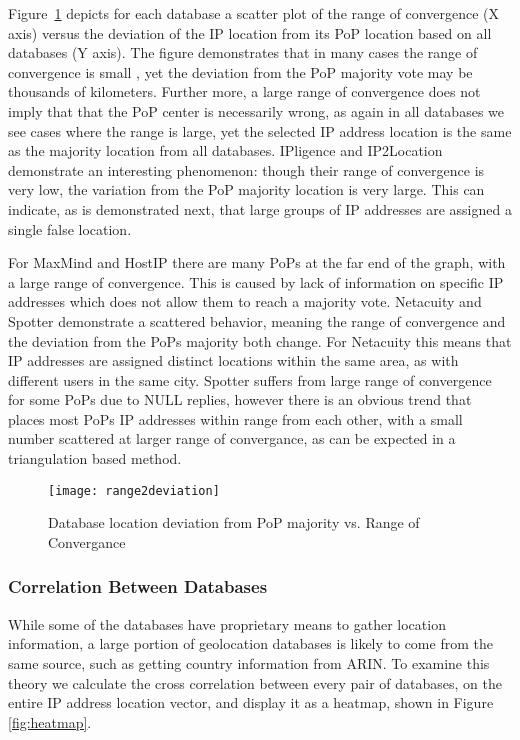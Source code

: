 Figure~\ref{fig:range2deviation} depicts for each database a scatter
plot of the range of convergence (X axis) versus the deviation of
the IP location from its PoP location based on all databases (Y
axis). The figure demonstrates that in many cases the range of
convergence is small , yet the deviation from the PoP majority vote
may be thousands of kilometers. Further more, a large range of
convergence does not imply that that the PoP center is necessarily
wrong, as again in all databases we see cases where the range is
large, yet the selected IP address location is the same as the
majority location from all databases. IPligence and IP2Location
demonstrate an interesting phenomenon: though their range of
convergence is very low, the variation from the PoP majority
location is very large. This can indicate, as is demonstrated next,
that large groups of IP addresses are assigned a single false
location.


For MaxMind and HostIP there are many PoPs at the far end of the
graph, with a large range of convergence. This is caused by lack of
information on specific IP addresses which does not allow them to
reach a majority vote. Netacuity and Spotter demonstrate a scattered
behavior, meaning the range of convergence and the deviation from
the PoPs majority both change. For Netacuity this means that IP
addresses are assigned distinct locations within the same area, as
with different users in the same city. Spotter suffers from large
range of convergence for some PoPs due to NULL replies, however
there is an obvious trend that places most PoPs IP addresses within
 range from each other, with a small number scattered at
larger range of convergance, as can be expected in a triangulation
based method.

\begin{figure}
\begin{minipage}[b]{\linewidth}
\centering
\texttt{[image: range2deviation]}
\caption{Database location deviation from PoP majority vs. Range of
Convergance} \label{fig:range2deviation}
\end{minipage}
\end{figure}

\subsubsection{Correlation Between Databases}

While some of the databases have proprietary means to gather
location information, a large portion of geolocation databases is
likely to come from the same source, such as getting country
information from ARIN. To examine this theory we calculate the cross
correlation between every pair of databases, on the entire IP
address location vector, and display it as a heatmap, shown in
Figure \ref{fig:heatmap}.

